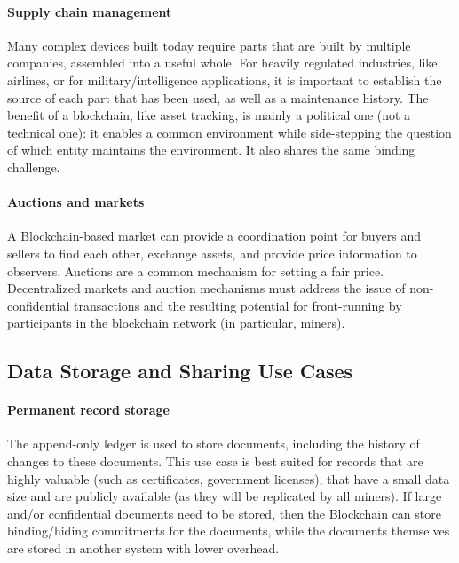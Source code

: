 \paragraph{Supply chain management} %
Many complex devices built today require parts that are built by multiple companies, assembled into a useful whole. For heavily regulated industries, like airlines, or for military/intelligence applications, it is important to establish the source of each part that has been used, as well as a maintenance history. The benefit of a blockchain, like asset tracking, is mainly a political one (not a technical one): it enables a common environment while side-stepping the question of which entity maintains the environment. It also shares the same binding challenge.

\paragraph{Auctions and markets}
A Blockchain-based market can provide a coordination point for buyers and sellers to find each other, exchange assets, and provide price information to observers. 
Auctions are a common mechanism for setting a fair price. 
Decentralized markets and auction mechanisms must address the issue of non-confidential transactions and the resulting potential for front-running by participants in the blockchain network (in particular, miners).

\subsection{Data Storage and Sharing Use Cases}

\paragraph{Permanent record storage}
The append-only ledger is used to store documents, including the history of changes to these documents.
This use case is best suited for records that are highly valuable (such as certificates, government licenses), that have a small data size and are publicly available (as they will be replicated by all miners).
If large and/or confidential documents need to be stored, then the Blockchain can store binding/hiding commitments for the documents, while the documents themselves are stored in another system with lower overhead.

